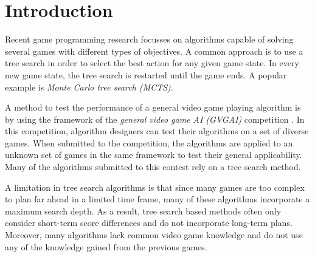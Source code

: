 \section{Introduction}
\label{sec:introduction}


Recent game programming research focusses on algorithms capable of solving
several games with different types of objectives. A common approach is to use a
tree search in order to select the best action for any given game state. In
every new game state, the tree search is restarted until the game ends.  A
popular example is \emph{Monte Carlo tree search (MCTS)}.

A method to test the performance of a general video game playing algorithm is
by using the framework of the \emph{general video game AI (GVGAI)} competition
\cite{perez2014}. In this competition, algorithm designers can test their
algorithms on a set of diverse games. When submitted to the competition, the
algorithms are applied to an unknown set of games in the same framework to test
their general applicability. Many of the algorithms submitted to this contest
rely on a tree search method.

A limitation in tree search algorithms is that since many games are too complex
to plan far ahead in a limited time frame, many of these algorithms incorporate
a maximum search depth. As a result, tree search based methods often only
consider short-term score differences and do not incorporate long-term plans.
Moreover, many algorithms lack common video game knowledge and do not use any of
the knowledge gained from the previous games.

